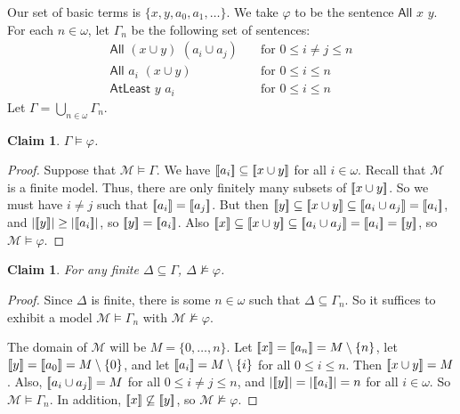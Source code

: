 \documentclass[letterpaper]{article} %
\newtheorem{claim}[theorem]{Claim}
\theoremstyle{definition}
\newcommand{\semantics}[1]{[\![\mbox{\em $ #1 $\/}]\!]}
\newcommand{\Model}{\mathcal{M}}
\newcommand{\set}[1]{\{ #1 \}}
\newcommand{\All}[2]{\mathsf{All}\,\,#1\,\,#2}
\newcommand{\Atleast}[2]{\mathsf{AtLeast}\,\,#1\,\,#2}
\begin{document}
 Our set of basic terms is $\set{x,y,a_0,a_1, \ldots}$.
We take $\varphi$ to be the sentence $\All{x}{y}$. For each $n\in \omega$, let $\Gamma_n$ be the following set of sentences:
\begin{align*}
\All{(x\cup y)}{(a_i\cup a_j)}&\quad \text{for }0\leq  i\neq j\leq n\\
\All{a_i}{(x\cup y)} &\quad \text{for  } 0\leq i\leq n\\
\Atleast{y}{a_i}&\quad \text{for } 0\leq i\leq n
\end{align*}
Let $\Gamma = \bigcup_{n\in \omega} \Gamma_n$. 

\begin{claim} $\Gamma\models \varphi$. 
\end{claim}

\begin{proof}
Suppose that $\Model\models \Gamma$. We have $\semantics{a_i}\subseteq \semantics{x\cup y}$ for all $i\in \omega$.
Recall that $\Model$ is a finite model.
Thus,  there are only finitely many subsets of $\semantics{x\cup y}$.
So we must have  $i\neq j$ such that  $\semantics{a_i} = \semantics{a_j}$. But then $\semantics{y}\subseteq \semantics{x\cup y}\subseteq \semantics{a_i\cup a_j}=\semantics{a_i}$, and $|\semantics{y}| \geq |\semantics{a_i}|$, so $\semantics{y} = \semantics{a_i}$. Also $\semantics{x}\subseteq \semantics{x\cup y}\subseteq \semantics{a_i\cup a_j}=\semantics{a_i} = \semantics{y}$, so $\Model\models \varphi$. 
\end{proof}

\begin{claim} For any finite $\Delta\subseteq \Gamma$, $\Delta\not\models \varphi$. 
\end{claim}
\begin{proof}
Since $\Delta$ is finite, there is some $n\in \omega$ such that $\Delta\subseteq \Gamma_n$. So it suffices to exhibit a model $\Model\models \Gamma_n$ with $\Model\not\models \varphi$. 

The domain of $\Model$ will be $M = \{0,\dots,n\}$. Let $\semantics{x} = \semantics{a_n} = M\setminus \{n\}$, let $\semantics{y} = \semantics{a_0} = M\setminus \{0\}$, and let $\semantics{a_i} = M\setminus \{i\}$ for all $0\leq i\leq n$. Then $\semantics{x\cup y} = M$. 
Also, $\semantics{a_i\cup a_j} = M$ for all $0\leq i \ne j\leq n$, and $|\semantics{y}| = |\semantics{a_i}| = n$ for all $i\in \omega$.
So $\mathcal{M}\models \Gamma_n$. 
In addition, $\semantics{x}\not\subseteq \semantics{y}$, so $\mathcal{M}\not\models \varphi$. 
\end{proof}
\end{document}
